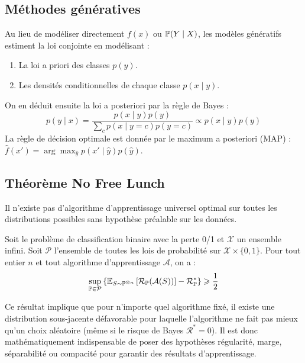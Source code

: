 \subsection{Méthodes génératives}

Au lieu de modéliser directement $f(x)$ ou $\mathbb{P}(Y \mid X)$, les modèles génératifs estiment la loi conjointe en modélisant :
\begin{enumerate}
    \item La loi a priori des classes $p(y)$.
    \item Les densités conditionnelles de chaque classe $p(x \mid y)$.
\end{enumerate}
On en déduit ensuite la loi a posteriori par la règle de Bayes :
\begin{equation}
    p(y \mid x) = \frac{p(x \mid y) p(y)}{\sum_{c} p(x \mid y=c) p(y=c)} \propto p(x \mid y) p(y)
\end{equation}
La règle de décision optimale est donnée par le maximum a posteriori (MAP) : $\hat{f}(x') = \arg \max_{\hat{y}} p(x' \mid \hat{y}) p(\hat{y})$.

\subsection{Théorème No Free Lunch}

Il n'existe pas d'algorithme d'apprentissage universel optimal sur toutes les distributions possibles sans hypothèse préalable sur les données.

\begin{theorem}
    Soit le problème de classification binaire avec la perte 0/1 et $\mathcal{X}$ un ensemble infini. Soit $\mathcal{P}$ l'ensemble de toutes les lois de probabilité sur $\mathcal{X} \times \{0, 1\}$. Pour tout entier $n$ et tout algorithme d'apprentissage $\mathcal{A}$, on a :
    \begin{equation}
        \sup_{\mathbb{P} \in \mathcal{P}} \left\{ \mathbb{E}_{S \sim \mathbb{P}^{\otimes n}} \left[ \mathcal{R}_{\mathbb{P}}(\mathcal{A}(S)) \right] - \mathcal{R}_{\mathbb{P}}^* \right\} \geqslant\frac{1}{2}
    \end{equation}
\end{theorem}

Ce résultat implique que pour n'importe quel algorithme fixé, il existe une distribution sous-jacente défavorable pour laquelle l'algorithme ne fait pas mieux qu'un choix aléatoire (même si le risque de Bayes $\mathcal{R}^* = 0$). Il est donc mathématiquement indispensable de poser des hypothèses régularité, marge, séparabilité ou compacité pour garantir des résultats d'apprentissage.

